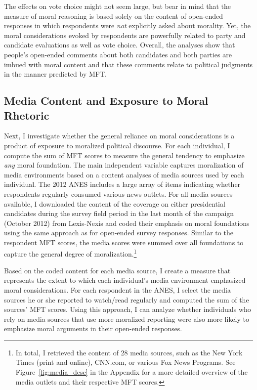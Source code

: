 \documentclass[12pt]{article}
\begin{document}
The effects on vote choice might not seem large, but bear in mind that the measure of moral reasoning is based solely on the content of open-ended responses in which respondents were \textit{not} explicitly asked about morality. Yet, the moral considerations evoked by respondents are powerfully related to party and candidate evaluations as well as vote choice. Overall, the analyses show that people's open-ended comments about both candidates and both parties are imbued with moral content and that these comments relate to political judgments in the manner predicted by MFT.


\subsection*{Media Content and Exposure to Moral Rhetoric}

Next, I investigate whether the general reliance on moral considerations is a product of exposure to moralized political discourse. For each individual, I compute the sum of MFT scores to measure the general tendency to emphasize \textit{any} moral foundation. The main independent variable captures moralization of media environments based on a content analyses of media sources used by each individual. The 2012 ANES includes a large array of items indicating whether respondents regularly consumed various news outlets. For all media sources available, I downloaded the content of the coverage on either presidential candidates during the survey field period in the last month of the campaign (October 2012) from Lexis-Nexis and coded their emphasis on moral foundations using the same approach as for open-ended survey responses. Similar to the respondent MFT scores, the media scores were summed over all foundations to capture the general degree of moralization.\footnote{In total, I retrieved the content of 28 media sources, such as the New York Times (print and online), CNN.com, or various Fox News Programs. See Figure~\ref{fig:media_desc} in the Appendix for a more detailed overview of the media outlets and their respective MFT scores.} 

Based on the coded content for each media source, I create a measure that represents the extent to which each individual's media environment emphasized moral considerations. For each respondent in the ANES, I select the media sources he or she reported to watch/read regularly and computed the sum of the sources' MFT scores. Using this approach, I can analyze whether individuals who rely on media sources that use more moralized reporting were also more likely to emphasize moral arguments in their open-ended responses.
\end{document}
